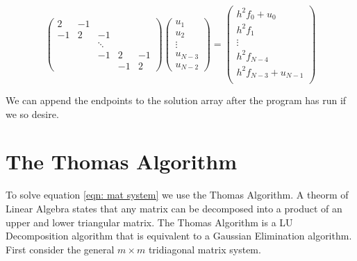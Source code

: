 \documentclass{article}
\begin{document}
\begin{equation}
\label{eqn: mat system}
\left( \begin{array}{ccccc}
	 2 & -1 &        &    &    \\
	-1 &  2 &   -1   &    &    \\
	   &    & \ddots &    &    \\
	   &	    &   -1   &  2 & -1 \\
	   &    &        & -1 &  2
   \end{array} \right)
\left( \begin{array}{c}
	u_1     \\
	u_2     \\
	\vdots  \\
	u_{N-3} \\
	u_{N-2}
   \end{array} \right)
=
\left( \begin{array}{c}
	h^2 f_0 + u_0     \\
	h^2 f_1           \\
	\vdots        \\
	h^2 f_{N-4}       \\
	h^2 f_{N-3} + u_{N-1} \\
   \end{array} \right)
\end{equation}

We can append the endpoints to the solution array after the program has run if we so desire.

\section{The Thomas Algorithm}
To solve equation \ref{eqn: mat system} we use the Thomas Algorithm.  A theorm of Linear Algebra states that any matrix can be decomposed into a product of an upper and lower triangular matrix.  The Thomas Algorithm is a LU Decomposition algorithm that is equivalent to a Gaussian Elimination algorithm.  First consider the general $m\times m$ tridiagonal matrix system.
\end{document}
